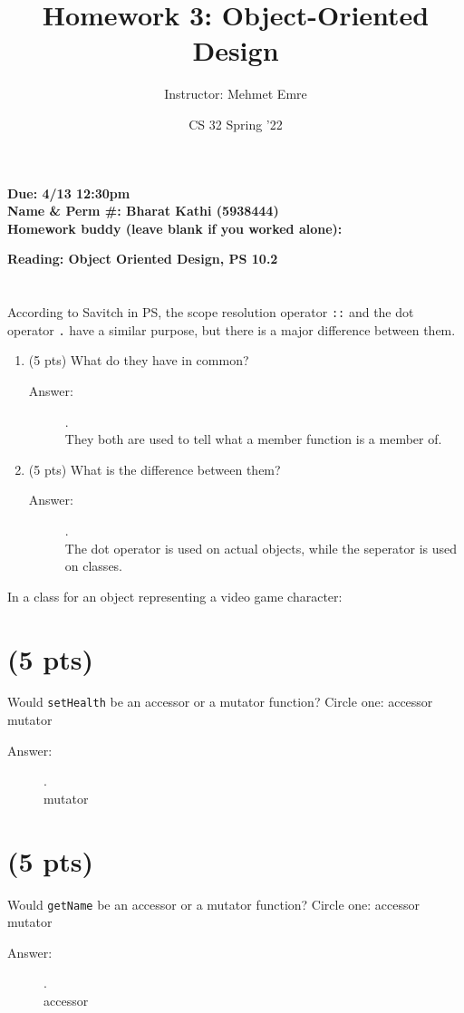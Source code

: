 \documentclass[11pt]{article}
\author{Instructor: Mehmet Emre}
\date{CS 32 Spring '22}
\title{Homework 3: Object-Oriented Design}
\begin{document}
\maketitle
\textbf{Due: 4/13 12:30pm} \\ 
\textbf{Name \& Perm \#: Bharat Kathi (5938444)} \\ 
\textbf{Homework buddy (leave blank if you worked alone):}

\textbf{Reading: Object Oriented Design, PS 10.2}


\section{}
\label{sec:org311bec3}
According to Savitch in PS, the scope resolution operator \texttt{::} and
the dot operator \texttt{.} have a similar purpose, but there is a major
difference between them.
\begin{enumerate}
\item (5 pts) What do they have in common?
\begin{description}
    \item[Answer:] .\\
    They both are used to tell what a member function is a member of.
  \end{description}
\vspace{2em}
\item (5 pts) What is the difference between them?
\begin{description}
    \item[Answer:] .\\
    The dot operator is used on actual objects, while the seperator is used on classes.
  \end{description}
\vspace{6em}
\end{enumerate}


In a class for an object representing a video game character: 
\section{(5 pts)}
\label{sec:orge0fd38b}
Would \texttt{setHealth} be an accessor or a mutator function?
    Circle one: accessor \(\quad\) mutator
    \begin{description}
        \item[Answer:] .\\
        mutator
    \end{description}
\section{(5 pts)}
\label{sec:org413e13f}
Would \texttt{getName} be an accessor or a mutator function?
    Circle one: accessor \(\quad\) mutator
    \begin{description}
        \item[Answer:] .\\
        accessor
    \end{description}
\end{document}
